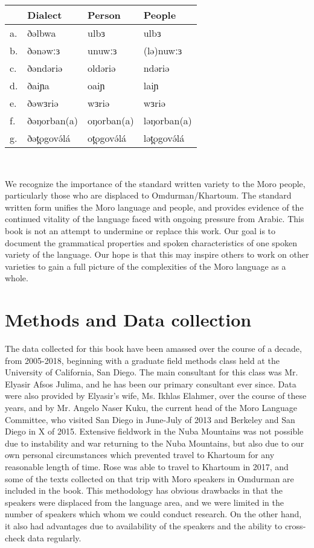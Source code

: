 \ea  
\begin{supertabular}[t]{llll}
 
&	Dialect	&	Person	&	People 		\\
\midrule
a.	&	ðəlbwa		&	ulbɜ	&	ulbɜ\\
b.	& 	ðənəwːɜ		& 	unuwːɜ	& 	(lə)nuwːɜ	 \\
c.	&	ðəndəriə	& 	oldəriə	& 	ndəriə	 \\
d.	&	ðaiɲa		&	oaiɲ	&	laiɲ \\
e.	&	ðəwɜriə		&	wɜriə 	&	wɜriə\\
f.	&	ðəŋorban(a)	&	oŋorban(a)	&	ləŋorban(a)	 \\
g.	&	ðət̪ogovə́lá	&	ot̪ogovə́lá	 &	lət̪ogovə́lá\\
\end{supertabular}\
\z 

We recognize the importance of the standard written variety to the Moro people, particularly those who are displaced to Omdurman/Khartoum. The standard written form unifies the Moro language and people, and provides evidence of the continued vitality of the language faced with ongoing pressure from Arabic. This book is not an attempt to undermine or replace this work. Our goal is to document the grammatical properties and spoken characteristics of one spoken variety of the language. Our hope is that this may inspire others to work on other varieties to gain a full picture of the complexities of the Moro language as a whole.  
	
\section{Methods and Data collection}
The data collected for this book have been amassed over the course of a decade, from 2005-2018, beginning with a graduate field methods class held at the University of California, San Diego. The main consultant for this class was Mr. Elyasir Afsos Julima, and he has been our primary consultant ever since. Data were also provided by Elyasir’s wife, Ms. Ikhlas Elahmer, over the course of these years, and by Mr. Angelo Naser Kuku, the current head of the Moro Language Committee, who visited San Diego in June-July of 2013 and Berkeley and San Diego in X of 2015. Extensive fieldwork in the Nuba Mountains was not possible due to instability and war returning to the Nuba Mountains, but also due to our own personal circumstances which prevented travel to Khartoum for any reasonable length of time. Rose was able to travel to Khartoum in 2017, and some of the texts collected on that trip with Moro speakers in Omdurman  are included in the book. This methodology has obvious drawbacks in that the speakers were displaced from the language area, and we were limited in the number of speakers which whom we could conduct research. On the other hand, it also had advantages due to availability of the speakers and the ability to cross-check data regularly. 

